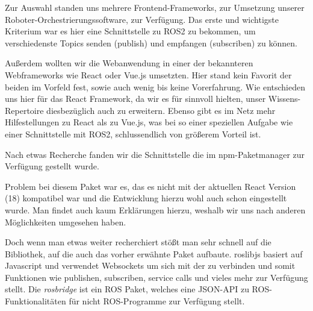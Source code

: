 \begin{flushleft}


    
    Zur Auswahl standen uns mehrere Frontend-Frameworks, zur Umsetzung unserer Roboter-Orchestrierungssoftware, zur Verfügung. Das erste und wichtigste Kriterium war es hier eine Schnittstelle zu ROS2 zu bekommen, um verschiedenste Topics senden (publish) und empfangen (subscriben) zu können. 

    Außerdem wollten wir die Webanwendung in einer der bekannteren Webframeworks wie React oder Vue.js umsetzten. Hier stand kein Favorit der beiden im Vorfeld fest, sowie auch wenig bis keine Vorerfahrung. Wie entschieden uns hier für das React Framework, da wir es für sinnvoll hielten, unser Wissens-Repertoire diesbezüglich auch zu erweitern. Ebenso gibt es im Netz mehr Hilfestellungen zu React als zu Vue.js, was bei so einer speziellen Aufgabe wie einer Schnittstelle mit ROS2, schlussendlich von größerem Vorteil ist. 

    Nach etwas Recherche fanden wir die \cite[React-ROS]{reactrospackage} Schnittstelle die im npm-Paketmanager zur Verfügung gestellt wurde.

    Problem bei diesem Paket war es, das es nicht mit der aktuellen React Version (18) kompatibel war und die Entwicklung hierzu wohl auch schon eingestellt wurde. Man findet auch kaum Erklärungen hierzu, weshalb wir uns nach anderen Möglichkeiten umgesehen haben.

    Doch wenn man etwas weiter recherchiert stößt man sehr schnell auf die \cite[roslibjs]{roslibjs_robotwebtools} Bibliothek, auf die auch das vorher erwähnte Paket aufbaute. 
    roslibjs basiert auf Javascript und verwendet Websockets um sich mit der \cite[rosbridge]{rosbridgepackage} zu verbinden und somit Funktionen wie publishen, subscriben, service calls und vieles mehr zur Verfügung stellt. Die \textit{rosbridge} ist ein ROS Paket, welches eine JSON-API zu ROS-Funktionalitäten für nicht ROS-Programme zur Verfügung stellt.


\end{flushleft}
